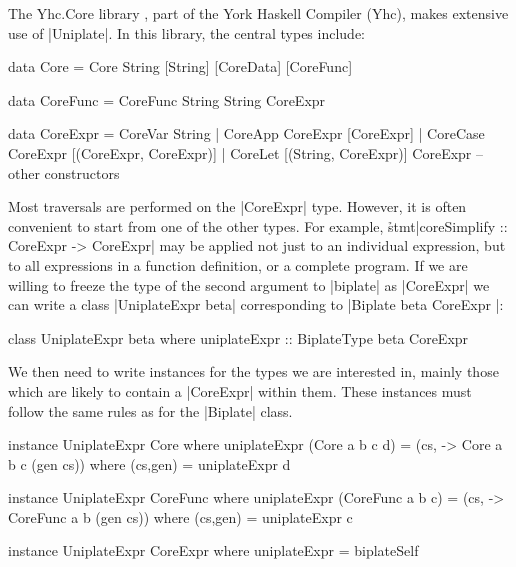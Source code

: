 \begin{example}
The Yhc.Core library \citep{me:yhc_core}, part of the York Haskell Compiler (Yhc), makes extensive use of |Uniplate|. In this library, the central types include:

\begin{comment}
\begin{code}
data CoreData = CoreData
\end{code}
\end{comment}

\begin{code}
data Core      =  Core String [String] [CoreData] [CoreFunc]

data CoreFunc  =  CoreFunc String String CoreExpr

data CoreExpr  =  CoreVar   String
               |  CoreApp   CoreExpr  [CoreExpr]
               |  CoreCase  CoreExpr  [(CoreExpr, CoreExpr)]
               |  CoreLet   [(String, CoreExpr)] CoreExpr
                  -- other constructors
\end{code}

Most traversals are performed on the |CoreExpr| type. However, it is often convenient to start from one of the other types. For example, \h{stmt}|coreSimplify :: CoreExpr -> CoreExpr| may be applied not just to an individual expression, but to all expressions in a function definition, or a complete program. If we are willing to freeze the type of the second argument to |biplate| as |CoreExpr| we can write a class |UniplateExpr beta| corresponding to |Biplate beta CoreExpr |:

\begin{code}
class  UniplateExpr beta where
       uniplateExpr :: BiplateType beta CoreExpr
\end{code}

We then need to write instances for the types we are interested in, mainly those which are likely to contain a |CoreExpr| within them. These instances must follow the same rules as for the |Biplate| class.

\begin{code}
instance UniplateExpr Core where
    uniplateExpr (Core a b c d) = (cs, \cs -> Core a b c (gen cs))
        where (cs,gen) = uniplateExpr d

instance UniplateExpr CoreFunc where
    uniplateExpr (CoreFunc a b c) = (cs, \cs -> CoreFunc a b (gen cs))
        where (cs,gen) = uniplateExpr c

instance UniplateExpr CoreExpr where
    uniplateExpr = biplateSelf


\end{code}
\end{example}
